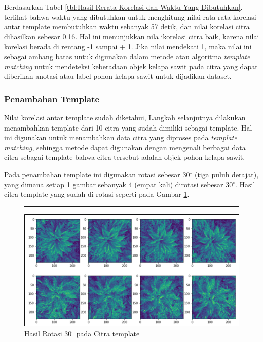 Berdasarkan Tabel \ref{tbl:Hasil-Rerata-Korelasi-dan-Waktu-Yang-Dibutuhkan}. terlihat bahwa waktu yang dibutuhkan untuk menghitung nilai rata-rata korelasi antar template membutuhkan waktu sebanyak 57 detik, dan nilai korelasi citra dihasilkan sebesar 0.16. Hal ini menunjukkan nila ikorelasi citra baik, karena nilai korelasi berada di rentang -1 sampai + 1. Jika nilai mendekati 1, maka nilai ini sebagai ambang batas untuk digunakan dalam metode atau algoritma \textit{template matching} untuk mendeteksi keberadaan objek kelapa sawit pada citra yang dapat diberikan anotasi atau label pohon kelapa sawit untuk dijadikan dataset.

\subsubsection{Penambahan Template}
\hspace{1,2cm}
Nilai korelasi antar template sudah diketahui, Langkah selanjutnya dilakukan menambahkan template dari 10 citra yang sudah dimiliki sebagai template. Hal ini digunakan untuk menambahkan data citra yang diproses pada \textit{template matching}, sehingga metode dapat digunakan dengan mengenali berbagai data citra sebagai template bahwa citra tersebut adalah objek pohon kelapa sawit. 

Pada penambahan template ini digunakan rotasi sebesar 30$^{\circ}$ (tiga puluh derajat), yang dimana setiap 1 gambar sebanyak 4 (empat kali) dirotasi sebesar 30$^{\circ}$. Hasil citra template yang sudah di rotasi seperti pada Gambar \ref{img:Hasil-Rotasi-30}. 

\begin{figure}[H]
	\vspace{-0.1cm}
	\rule{\columnwidth}{0.1pt}
	\begin{center}
		\includegraphics[width=1\columnwidth]{bab4/Gambar/Picture15.png}
	\end{center}
	\vspace{-0.2cm}
	\captionsetup{justification=centering}
	\caption{Hasil Rotasi 30$^{\circ}$ pada Citra template}\label{img:Hasil-Rotasi-30}
\end{figure}

